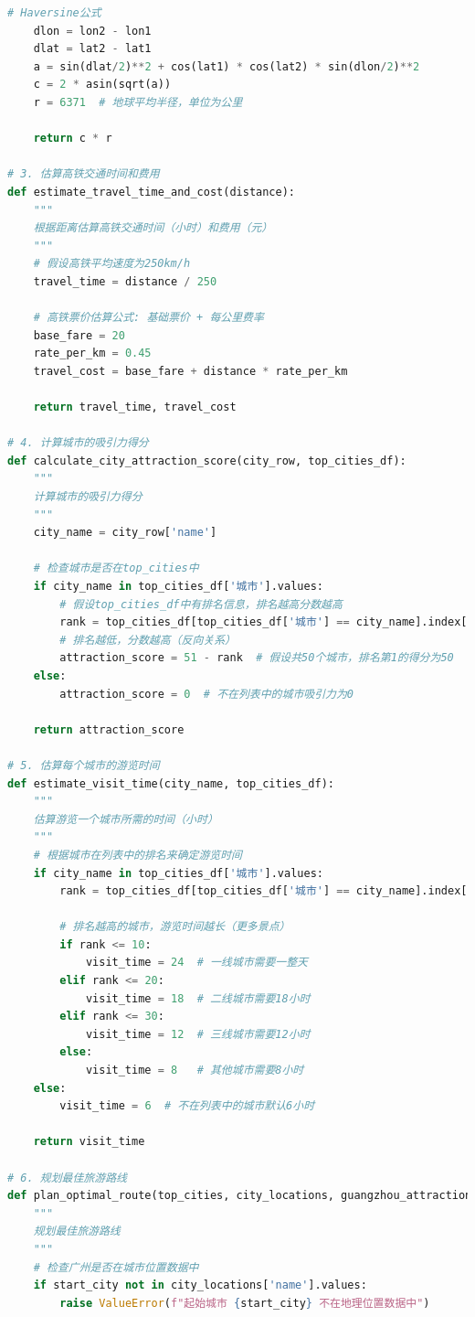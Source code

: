 \documentclass[withoutpreface,bwprint]{cumcmthesis} %
\begin{document}
\begin{appendices}
\begin{lstlisting}[language=python]
    # Haversine公式
    dlon = lon2 - lon1
    dlat = lat2 - lat1
    a = sin(dlat/2)**2 + cos(lat1) * cos(lat2) * sin(dlon/2)**2
    c = 2 * asin(sqrt(a))
    r = 6371  # 地球平均半径，单位为公里
    
    return c * r

# 3. 估算高铁交通时间和费用
def estimate_travel_time_and_cost(distance):
    """
    根据距离估算高铁交通时间（小时）和费用（元）
    """
    # 假设高铁平均速度为250km/h 
    travel_time = distance / 250
    
    # 高铁票价估算公式: 基础票价 + 每公里费率 
    base_fare = 20
    rate_per_km = 0.45
    travel_cost = base_fare + distance * rate_per_km
    
    return travel_time, travel_cost

# 4. 计算城市的吸引力得分
def calculate_city_attraction_score(city_row, top_cities_df):
    """
    计算城市的吸引力得分
    """
    city_name = city_row['name']
    
    # 检查城市是否在top_cities中
    if city_name in top_cities_df['城市'].values:
        # 假设top_cities_df中有排名信息，排名越高分数越高
        rank = top_cities_df[top_cities_df['城市'] == city_name].index[0] + 1
        # 排名越低，分数越高（反向关系）
        attraction_score = 51 - rank  # 假设共50个城市，排名第1的得分为50
    else:
        attraction_score = 0  # 不在列表中的城市吸引力为0
    
    return attraction_score

# 5. 估算每个城市的游览时间
def estimate_visit_time(city_name, top_cities_df):
    """
    估算游览一个城市所需的时间（小时）
    """
    # 根据城市在列表中的排名来确定游览时间
    if city_name in top_cities_df['城市'].values:
        rank = top_cities_df[top_cities_df['城市'] == city_name].index[0] + 1
        
        # 排名越高的城市，游览时间越长（更多景点）
        if rank <= 10:
            visit_time = 24  # 一线城市需要一整天
        elif rank <= 20:
            visit_time = 18  # 二线城市需要18小时
        elif rank <= 30:
            visit_time = 12  # 三线城市需要12小时
        else:
            visit_time = 8   # 其他城市需要8小时
    else:
        visit_time = 6  # 不在列表中的城市默认6小时
    
    return visit_time

# 6. 规划最佳旅游路线
def plan_optimal_route(top_cities, city_locations, guangzhou_attractions, start_city="广州", max_hours=144):
    """
    规划最佳旅游路线
    """
    # 检查广州是否在城市位置数据中
    if start_city not in city_locations['name'].values:
        raise ValueError(f"起始城市 {start_city} 不在地理位置数据中")
    

\end{lstlisting}
\end{appendices}
\end{document}
